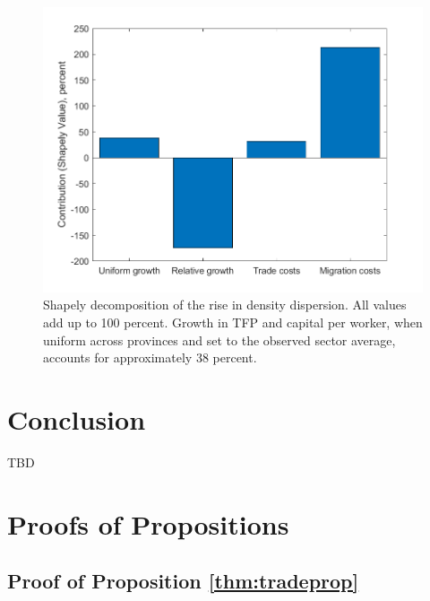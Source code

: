 \documentclass[]{article}
\theoremstyle{plain}
\begin{document}
	\begin{figure}[h]
		\includegraphics[width=\textwidth]{ShapelyDecomp.png}
		\caption{Shapely decomposition of the rise in density dispersion. All values add up to 100 percent. Growth in TFP and capital per worker, when uniform across provinces and set to the observed sector average, accounts for approximately 38 percent.}
		\label{fig:Shapely}
	\end{figure}



\section{Conclusion}\label{section:conclusion}
TBD




\newpage
\clearpage
\nocite{*}
\scriptsize





\newpage
\appendix
\normalsize
\section{Proofs of Propositions}\label{appendix:proofs}

\subsection*{Proof of Proposition \ref{thm:tradeprop}}
\paragraph*{}
\end{document}
